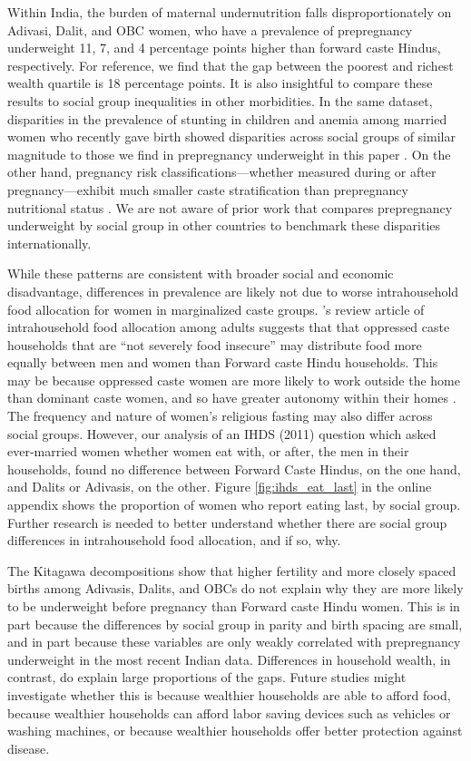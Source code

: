 Within India, the burden of maternal undernutrition falls disproportionately on Adivasi, Dalit, and OBC women, who have a prevalence of prepregnancy underweight 11, 7, and 4 percentage points higher than forward caste Hindus, respectively. For reference, we find that the gap between the poorest and richest wealth quartile is 18 percentage points. It is also insightful to compare these results to social group inequalities in other morbidities. In the same dataset, disparities in the prevalence of stunting in children and anemia among married women who recently gave birth showed disparities across social groups of similar magnitude to those we find in prepregnancy underweight in this paper \citep{rao2023trends, das2024prevalence}. On the other hand, pregnancy risk classifications—whether measured during or after pregnancy—exhibit much smaller caste stratification than prepregnancy nutritional status \citep{kuppusamy2023high, tandon2023adverse}. We are not aware of prior work that compares prepregnancy underweight by social group in other countries to benchmark these disparities internationally.

While these patterns are consistent with broader social and economic disadvantage, differences in prevalence are likely not due to worse intrahousehold food allocation for women in marginalized caste groups. \cite{harris2017determinants}'s review article of intrahousehold food allocation among adults suggests that that oppressed caste households that are ``not severely food insecure'' may distribute food more equally between men and women than Forward caste Hindu households. This may be because oppressed caste women are more likely to work outside the home than dominant caste women, and so have greater autonomy within their homes \citep{chakrabarty1996gender, eswaran2013status}.  The frequency and nature of women's religious fasting may also differ across social groups.  However, our analysis of an IHDS (2011) question which asked ever-married women whether women eat with, or after, the men in their households, found no difference between Forward Caste Hindus, on the one hand, and Dalits or Adivasis, on the other.  Figure \ref{fig:ihds_eat_last} in the online appendix shows the proportion of women who report eating last, by social group.  Further research is needed to better understand whether there are social group differences in intrahousehold food allocation, and if so, why.  

The Kitagawa decompositions show that higher fertility and more closely spaced births among Adivasis, Dalits, and OBCs do not explain why they are more likely to be underweight before pregnancy than Forward caste Hindu women.  This is in part because the differences by social group in parity and birth spacing are small, and in part because these variables are only weakly correlated with prepregnancy underweight in the most recent Indian data. Differences in household wealth, in contrast, do explain large proportions of the gaps.  Future studies might investigate whether this is because wealthier households are able to afford food, because wealthier households can afford labor saving devices such as vehicles or washing machines, or because wealthier households offer better protection against disease.  


